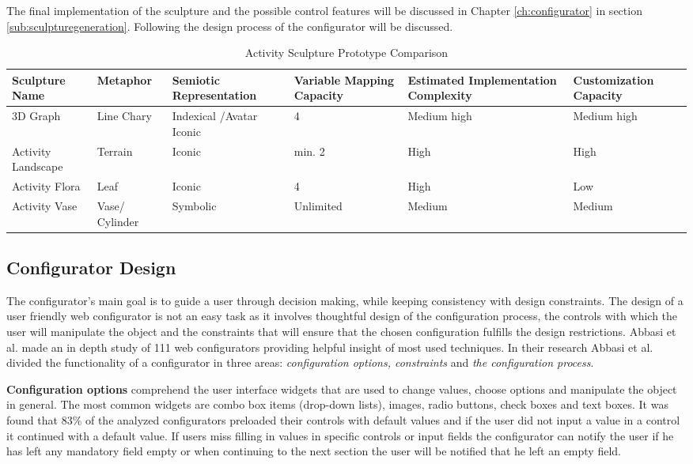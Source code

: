 \documentclass[../medieninformatik-arbeit.tex]{subfiles}
\begin{document}
The final implementation of the sculpture and the possible control features will be discussed in Chapter \ref{ch:configurator} in section \ref{sub:sculpturegeneration}. Following the design process of the configurator will be discussed.   

\begin{table}[h]
\centering
\begin{tabular}{*{6}{|p{2.1cm}}|}
 \hline
 Sculpture Name & Metaphor & Semiotic Representation & Variable Mapping Capacity & Estimated Implementation Complexity & Customization Capacity \\
 \hline
 3D Graph & Line Chary & Indexical 	/Avatar Iconic & 4 & Medium high & Medium high\\
 \hline
 Activity Landscape & Terrain & Iconic & min. 2 & High & High\\
 \hline
 Activity Flora & Leaf & Iconic & 4 & High & Low\\
 \hline
 Activity Vase & Vase/	Cylinder & Symbolic & Unlimited & Medium & Medium\\
 \hline
\end{tabular}
\caption{Activity Sculpture Prototype Comparison}
\label{tab:comparison}
\end{table}

\subsection{Configurator Design}
The configurator's main goal is to guide a user through decision making, while keeping consistency with design constraints\cite{abbasi2012s}. The design of a user friendly web configurator is not an easy task as it involves thoughtful design of the configuration process, the controls with which the user will manipulate the object and the constraints that will ensure that the chosen configuration fulfills the design restrictions. Abbasi et al. made an in depth study of 111 web configurators\cite{abbasi2012s} providing helpful insight of most used techniques. In their research Abbasi et al. divided the functionality of a configurator in three areas: \textit{configuration options, constraints} and \textit{the configuration process}. 

\textbf{Configuration options} comprehend the user interface widgets that are used to change values, choose options and manipulate the object in general. The most common widgets are combo box items (drop-down lists), images, radio buttons, check boxes and text boxes. It was found that 83\% of the analyzed configurators preloaded their controls with default values and if the user did not input a value in a control it continued with a default value. If users miss filling in values in specific controls or input fields the configurator can notify the user if he has left any mandatory field empty or when continuing to the next section the user will be notified that he left an empty field.
\end{document}
